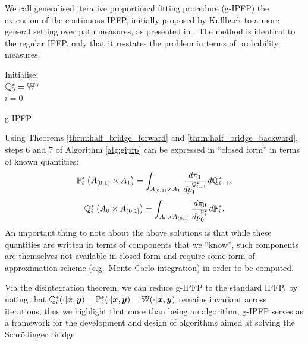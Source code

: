 \documentclass[a4paper,12pt,twoside,openright]{report}
\theoremstyle{definition}
\begin{document}
We call generalised iterative proportional fitting procedure (g-IPFP) the extension of the continuous IPFP, initially proposed by Kullback to a more general setting over path measures, as presented in \cite{cramer2000probability, bernton2019schr}. The method is identical to the regular IPFP, only that it re-states the problem in terms of probability measures.
\begin{algorithm} \label{alg:gipfp}
Initialise:\\
${\mathbb{Q}}^{*}_0 =\mathbb{W}^{\gamma}$\\
$i=0$ \\
\caption{g-IPFP \citep{cramer2000probability} }
\end{algorithm}

Using Theorems \ref{thrm:half_bridge_forward} and \ref{thrm:half_bridge_backward}, steps 6 and 7 of Algorithm \ref{alg:gipfp} can be expressed in ``closed form'' in terms of known quantities:
\begin{align}
    {{\mathbb{P}}}^{*}_i\left( A_{[0,1)} \times A_1\right) =  \int_{ A_{[0,1)} \times A_1}  \frac{d \pi_1}{ d p_1^{{\mathbb{Q}}^{*}_{i-1}}} d{\mathbb{Q}}^{*}_{i-1},
\end{align}
\begin{align}
    {{\mathbb{Q}}}^{*}_i\left(A_0 \times A_{(0,1]}\right) =  \int_{A_0\times A_{(0,1]}} \frac{d \pi_0}{ dp_0^{{\mathbb{P}}^{*}_i}} d{\mathbb{P}}^{*}_i.
\end{align}
An important thing to note about the above solutions is that while these quantities are written in terms of components that we ``know'', such components are themselves not available in closed form and require some form of approximation scheme (e.g.\ Monte Carlo integration) in order to be computed.

Via the disintegration theorem, we can reduce g-IPFP to the standard IPFP, by noting that ${\mathbb{Q}}^*_i(\cdot |{\bm{x}},{\bm{y}}) ={\mathbb{P}}^*_i(\cdot |{\bm{x}},{\bm{y}}) = \mathbb{W}(\cdot |{\bm{x}},{\bm{y}})$ remains invariant across iterations, thus we highlight that more than being an algorithm, g-IPFP serves as a framework for the development and design of algorithms aimed at solving the Schrödinger Bridge.
\end{document}
